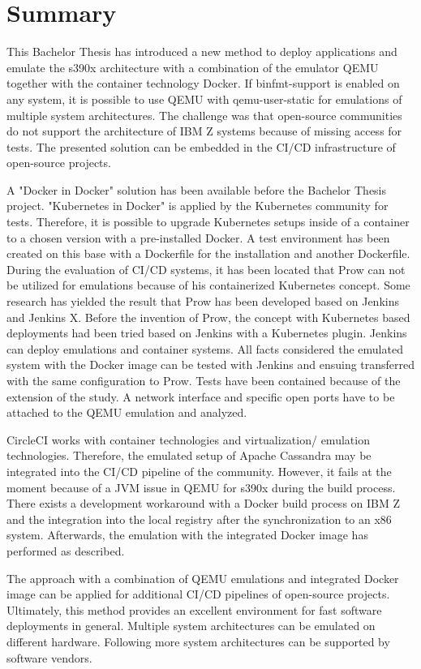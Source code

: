 \chapter{Summary}\label{ch:summary}

This Bachelor Thesis has introduced a new method to deploy applications and emulate the s390x architecture with a combination of the emulator \gls{QEMU} together with the container technology Docker.
If binfmt-support is enabled on any system, it is possible to use \gls{QEMU} with qemu-user-static for emulations of multiple system architectures. 
The challenge was that open-source communities do not support the architecture of IBM Z systems because of missing access for tests. The presented solution can be embedded in the \gls{CI/CD} infrastructure of open-source projects. 

A "Docker in Docker" solution has been available before the Bachelor Thesis project. "Kubernetes in Docker" is applied by the Kubernetes community for tests. 
Therefore, it is possible to upgrade Kubernetes setups inside of a container to a chosen version with a pre-installed Docker. A test environment has been created on this base with a Dockerfile for the installation and another Dockerfile. During the evaluation of \gls{CI/CD} systems, it has been located that Prow can not be utilized for emulations because of his containerized Kubernetes concept. 
Some research has yielded the result that Prow has been developed based on Jenkins and Jenkins X. Before the invention of Prow, the concept with Kubernetes based deployments had been  tried based on Jenkins with a Kubernetes plugin. Jenkins can deploy emulations and container systems. 
All facts considered the emulated system with the Docker image can be tested with Jenkins and ensuing transferred with the same configuration to Prow.
Tests have been contained because of the extension of the study. A network interface and specific open ports have to be attached to the \gls{QEMU} emulation and analyzed. 

CircleCI works with container technologies and virtualization/ emulation technologies. 
Therefore, the emulated setup of Apache Cassandra may be integrated into the \gls{CI/CD} pipeline of the community. However, it fails at the moment because of a JVM issue in \gls{QEMU} for s390x during the build process. 
There exists a development workaround with a Docker build process on IBM Z and the integration into the local registry after the synchronization to an x86 system. Afterwards, the emulation with the integrated Docker image has performed as described.

The approach with a combination of \gls{QEMU} emulations and integrated Docker image can be applied for additional \gls{CI/CD} pipelines of open-source projects. Ultimately, this method provides an excellent environment for fast software deployments in general. 
Multiple system architectures can be emulated on different hardware. Following more system architectures can be supported by software vendors.